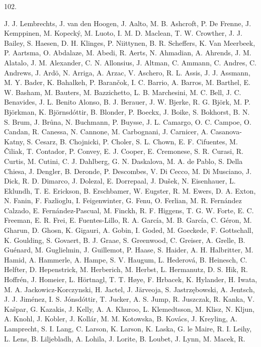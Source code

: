 \documentclass[
  letterpaper,
]{article}
\newlength{\cslhangindent}
\newlength{\csllabelwidth}
\newenvironment{CSLReferences}[2] %
 {\begin{list}{}{%
  \setlength{\itemindent}{0pt}
  \setlength{\leftmargin}{0pt}
  \setlength{\parsep}{0pt}
  \ifodd #1
   \setlength{\leftmargin}{\cslhangindent}
   \setlength{\itemindent}{-1\cslhangindent}
  \fi
  \setlength{\itemsep}{#2\baselineskip}}}
 {\end{list}}
\newcommand{\CSLLeftMargin}[1]{\parbox[t]{\csllabelwidth}{\strut#1\strut}}
\newcommand{\CSLRightInline}[1]{\parbox[t]{\linewidth - \csllabelwidth}{\strut#1\strut}}
\begin{document}
\begin{CSLReferences}{0}{1}
\CSLLeftMargin{102. }%
\CSLRightInline{J. J. Lembrechts, J. van den Hoogen, J. Aalto, M. B.
Ashcroft, P. De Frenne, J. Kemppinen, M. Kopecký, M. Luoto, I. M. D.
Maclean, T. W. Crowther, J. J. Bailey, S. Haesen, D. H. Klinges, P.
Niittynen, B. R. Scheffers, K. Van Meerbeek, P. Aartsma, O. Abdalaze, M.
Abedi, R. Aerts, N. Ahmadian, A. Ahrends, J. M. Alatalo, J. M.
Alexander, C. N. Allonsius, J. Altman, C. Ammann, C. Andres, C. Andrews,
J. Ardö, N. Arriga, A. Arzac, V. Aschero, R. L. Assis, J. J. Assmann, M.
Y. Bader, K. Bahalkeh, P. Barančok, I. C. Barrio, A. Barros, M. Barthel,
E. W. Basham, M. Bauters, M. Bazzichetto, L. B. Marchesini, M. C. Bell,
J. C. Benavides, J. L. Benito Alonso, B. J. Berauer, J. W. Bjerke, R. G.
Björk, M. P. Björkman, K. Björnsdóttir, B. Blonder, P. Boeckx, J. Boike,
S. Bokhorst, B. N. S. Brum, J. Brůna, N. Buchmann, P. Buysse, J. L.
Camargo, O. C. Campoe, O. Candan, R. Canessa, N. Cannone, M. Carbognani,
J. Carnicer, A. Casanova-Katny, S. Cesarz, B. Chojnicki, P. Choler, S.
L. Chown, E. F. Cifuentes, M. Čiliak, T. Contador, P. Convey, E. J.
Cooper, E. Cremonese, S. R. Curasi, R. Curtis, M. Cutini, C. J.
Dahlberg, G. N. Daskalova, M. A. de Pablo, S. Della Chiesa, J. Dengler,
B. Deronde, P. Descombes, V. Di Cecco, M. Di Musciano, J. Dick, R. D.
Dimarco, J. Dolezal, E. Dorrepaal, J. Dušek, N. Eisenhauer, L. Eklundh,
T. E. Erickson, B. Erschbamer, W. Eugster, R. M. Ewers, D. A. Exton, N.
Fanin, F. Fazlioglu, I. Feigenwinter, G. Fenu, O. Ferlian, M. R.
Fernández Calzado, E. Fernández-Pascual, M. Finckh, R. F. Higgens, T. G.
W. Forte, E. C. Freeman, E. R. Frei, E. Fuentes-Lillo, R. A. García, M.
B. García, C. Géron, M. Gharun, D. Ghosn, K. Gigauri, A. Gobin, I.
Goded, M. Goeckede, F. Gottschall, K. Goulding, S. Govaert, B. J. Graae,
S. Greenwood, C. Greiser, A. Grelle, B. Guénard, M. Guglielmin, J.
Guillemot, P. Haase, S. Haider, A. H. Halbritter, M. Hamid, A. Hammerle,
A. Hampe, S. V. Haugum, L. Hederová, B. Heinesch, C. Helfter, D.
Hepenstrick, M. Herberich, M. Herbst, L. Hermanutz, D. S. Hik, R.
Hoffrén, J. Homeier, L. Hörtnagl, T. T. Høye, F. Hrbacek, K. Hylander,
H. Iwata, M. A. Jackowicz-Korczynski, H. Jactel, J. Järveoja, S.
Jastrzębowski, A. Jentsch, J. J. Jiménez, I. S. Jónsdóttir, T. Jucker,
A. S. Jump, R. Juszczak, R. Kanka, V. Kašpar, G. Kazakis, J. Kelly, A.
A. Khuroo, L. Klemedtsson, M. Klisz, N. Kljun, A. Knohl, J. Kobler, J.
Kollár, M. M. Kotowska, B. Kovács, J. Kreyling, A. Lamprecht, S. I.
Lang, C. Larson, K. Larson, K. Laska, G. le Maire, R. I. Leihy, L. Lens,
B. Liljebladh, A. Lohila, J. Lorite, B. Loubet, J. Lynn, M. Macek, R.
}
\end{CSLReferences}
\end{document}
